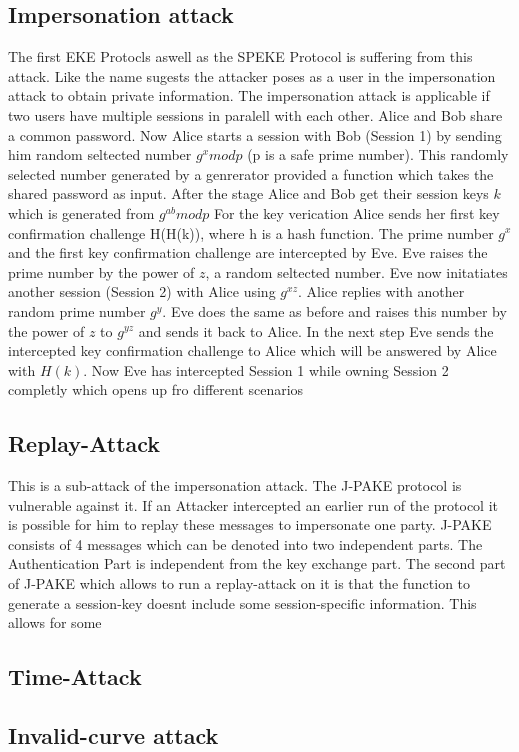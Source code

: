 \documentclass[journal]{IEEEtran}
\begin{document}
\subsection{Impersonation attack}
The first EKE Protocls aswell as the SPEKE Protocol is suffering from this attack.
Like the name sugests the attacker poses as a user in the impersonation attack to obtain private information. 
The impersonation attack is applicable if two users have multiple sessions in paralell with each other.
Alice and Bob share a common password. Now Alice starts a session with Bob (Session 1) by sending him random seltected number $g^x mod p$ (p is a safe prime number).
This randomly selected number generated by a genrerator provided a function which takes the shared password as input.
After the stage Alice and Bob get their session keys $k$ which is generated from $g^{ab} mod p$ 
For the key verication Alice sends her first key confirmation challenge H(H(k)), where h is a hash function.
The prime number $g^x$ and the first key confirmation challenge are intercepted by Eve. Eve raises the prime number by the power of $z$, a random seltected number.
Eve now initatiates another session (Session 2) with Alice using $g^{xz}$. Alice replies with another random prime number $g^y$.
Eve does the same as before and raises this number by the power of $z$ to $g^{yz}$ and sends it back to Alice.
In the next step Eve sends the intercepted key confirmation challenge to Alice which will be answered by Alice with $H(k)$.
Now Eve has intercepted Session 1 while owning Session 2 completly which opens up fro different scenarios 

\subsection{Replay-Attack}
This is a sub-attack of the impersonation attack. The J-PAKE protocol is vulnerable against it.
If an Attacker intercepted an earlier run of the protocol it is possible for him to replay these messages to impersonate one party.
J-PAKE consists of 4 messages which can be denoted into two independent parts. The Authentication Part is independent from the key exchange part.
The second part of J-PAKE which allows to run a replay-attack on it is that the function to generate a session-key doesnt include some session-specific information.
This allows for some 
\subsection{Time-Attack}
\subsection{Invalid-curve attack}
\end{document}
